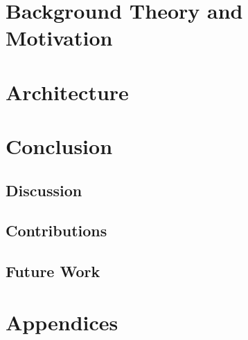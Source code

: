\documentclass[a4paper, 11pt]{book}
\begin{document}
\chapter{Background Theory and Motivation}


\chapter{Architecture}



\chapter{Conclusion}
\section{Discussion}
\section{Contributions}
\section{Future Work}

\backmatter





\chapter{Appendices}


\end{document}
